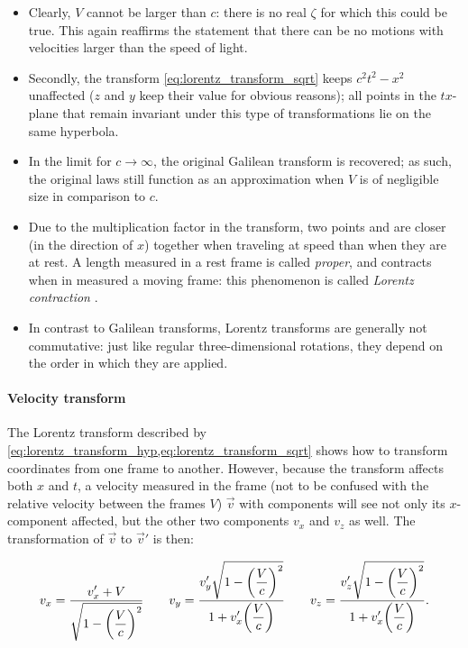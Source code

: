 \begin{itemize}
    \item Clearly, \(V\) cannot be larger than \(c\): there is no real \(\zeta\) for which this could be true. This again reaffirms the statement that there can be no motions with velocities larger than the speed of light.
    \item Secondly, the transform \cref{eq:lorentz_transform_sqrt} keeps \(c^2t^2 - x^2\) unaffected (\(z\) and \(y\) keep their value for obvious reasons); all points in the \(tx\)-plane that remain invariant under this type of transformations lie on the same hyperbola. %
    \item In the limit for \(c \to \infty\), the original Galilean transform is recovered; as such, the original laws still function as an approximation when \(V\) is of negligible size in comparison to \(c\).
    \item Due to the multiplication factor in the transform, two points and are closer (in the direction of $x$) together when traveling at speed than when they are at rest. A length measured in a rest frame is called \emph{proper}, and contracts when in measured a moving frame: this phenomenon is called \emph{Lorentz contraction}   \cite{Landau1971}.
    \item In contrast to Galilean transforms, Lorentz transforms are generally not commutative: just like regular three-dimensional rotations, they depend on the order in which they are applied.
\end{itemize}
\paragraph{Velocity transform} The Lorentz transform described by \cref{eq:lorentz_transform_hyp,eq:lorentz_transform_sqrt} shows how to transform coordinates from one frame to another. However, because the transform affects both \(x\) and \(t\), a velocity measured in the frame (not to be confused with the relative velocity between the frames \(V\)) \(\vec{v}\) with components will see not only its \(x\)-component affected, but the other two components \(v_x\) and \(v_z\) as well. The transformation of \(\vec{v}\) to \(\vec{v}'\) is then: \cite{Landau1971}

\begin{equation}
    v_x = \frac{\displaystyle v_x' + V}{\displaystyle \sqrt{1 - \qty(\frac{V}{c})^2}}\qquad 
    v_y = \frac{\displaystyle v_y'\sqrt{1 - \qty(\frac{V}{c})^2}}{\displaystyle 1 + v_x'
    \qty(\frac{V}{c})}\qquad
    v_z = \frac{\displaystyle v_z'\sqrt{1 - \qty(\frac{V}{c})^2}}{\displaystyle 1 + v_x'\qty(\frac{V}{c})}.
    \label{eq:lorentz_transform_vel}
\end{equation}


